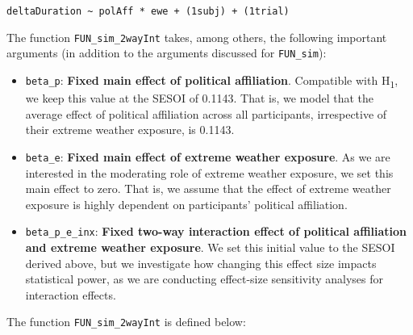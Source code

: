 \documentclass[
  letterpaper,
  DIV=11,
  numbers=noendperiod]{scrartcl}
\begin{document}
\texttt{deltaDuration\ \textasciitilde{}\ polAff\ *\ ewe\ +\ (1\textbar{}subj)\ +\ (1\textbar{}trial)}

The function \texttt{FUN\_sim\_2wayInt} takes, among others, the
following important arguments (in addition to the arguments discussed
for \texttt{FUN\_sim}):

\begin{itemize}
\item
  \texttt{beta\_p}: \textbf{Fixed main effect of political affiliation}.
  Compatible with H\textsubscript{1}, we keep this value at the SESOI of
  0.1143. That is, we model that the average effect of political
  affiliation across all participants, irrespective of their extreme
  weather exposure, is 0.1143.
\item
  \texttt{beta\_e}: \textbf{Fixed main effect of extreme weather
  exposure}. As we are interested in the moderating role of extreme
  weather exposure, we set this main effect to zero. That is, we assume
  that the effect of extreme weather exposure is highly dependent on
  participants' political affiliation.
\item
  \texttt{beta\_p\_e\_inx}: \textbf{Fixed two-way interaction effect of
  political affiliation and extreme weather exposure}. We set this
  initial value to the SESOI derived above, but we investigate how
  changing this effect size impacts statistical power, as we are
  conducting effect-size sensitivity analyses for interaction effects.
\end{itemize}

The function \texttt{FUN\_sim\_2wayInt} is defined below:
\end{document}
